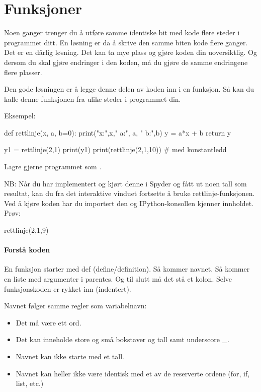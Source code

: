 \section{Funksjoner}
Noen ganger trenger du å utføre samme identiske bit med kode flere steder i programmet ditt. En løsning er da å skrive den samme biten kode flere ganger. Det er en dårlig løsning. Det kan ta mye plass og gjøre koden din uoversiktlig. Og dersom du skal gjøre endringer i den koden, må du gjøre de samme endringene flere plasser. 

Den gode løsningen er å legge denne delen av koden inn i en funksjon. Så kan du kalle denne funksjonen fra ulike steder i programmet din.

Eksempel:
\begin{usncodebox}
def rettlinje(x, a, b=0):
    print("x:",x,"  a:", a, "  b:",b)
    y = a*x + b
    return y
    
y1 = rettlinje(2,1)
print(y1)
print(rettlinje(2,1,10))   # med konstantledd
\end{usncodebox}

Lagre gjerne programmet som .

NB: Når du har implementert og kjørt denne i Spyder og fått ut noen tall som resultat, kan du fra det interaktive vinduet fortsette å bruke rettlinje-funksjonen. Ved å kjøre koden har du importert den og IPython-konsollen kjenner innholdet. 
Prøv:

\begin{usncodebox}
rettlinje(2,1,9) 
\end{usncodebox}

\paragraph*{Forstå koden}
En funksjon starter med def (define/definition). Så kommer navnet. Så kommer en liste med argumenter i parentes. Og til slutt må det stå et kolon. Selve funksjonskoden er rykket inn (indentert).

Navnet følger samme regler som variabelnavn:
\begin{itemize}
\item Det må være ett ord.
\item Det kan inneholde store og små bokstaver og tall samt underscore \_.
\item Navnet kan ikke starte med et tall.
\item Navnet kan heller ikke være identisk med et av de reserverte ordene (for, if, list, etc.) 
\end{itemize}

